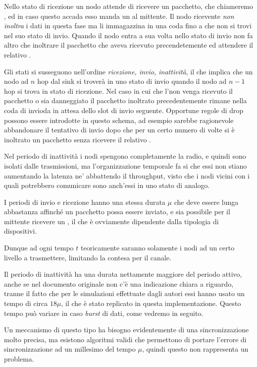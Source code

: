\documentclass[twoside,11pt,a4paper,italian,openany]{book}
\begin{document}
Nello stato di ricezione un nodo attende di ricevere un pacchetto, che chiameremo \req,
ed in caso questo accada esso manda un \ack al mittente. 
Il nodo ricevente \emph{non inoltra} i dati in questa 
fase ma li immagazzina in una coda fino a che non si trovi nel suo stato di invio. 
Quando il nodo entra a sua volta nello stato di invio non fa altro che inoltrare il pacchetto 
che aveva ricevuto precendetemente ed attendere il relativo \ack.  

Gli stati si susseguono nell'ordine \emph{ricezione, invio, inattività}, il che implica
che un nodo ad $n$ hop dal sink si troverà in uno stato di invio quando il nodo ad $n-1$ 
hop si trova in stato di ricezione. 
Nel caso in cui che l'\ack  non venga ricevuto il pacchetto o sia danneggiato il pacchetto 
inoltrato precedentemente rimane nella coda di invioda in attesa dello slot di invio seguente. 
Opportune regole di drop possono essere introdotte in questo schema, ad esempio sarebbe 
ragionevole abbandonare il tentativo di invio dopo che per un certo numero di volte si è 
inoltrato un pacchetto senza ricevere il relativo \ack. 
 
Nel periodo di inattività i nodi spengono completamente la radio, e quindi sono isolati dalle 
trasmissioni, ma l'organizzazione temporale fa si che essi non stiano aumentando la latenza ne' 
abbattendo il throughput, visto che i nodi vicini con i quali potrebbero comunicare sono 
anch'essi in uno stato di analogo. 

I periodi di invio e ricezione hanno una stessa durata $\mu$ che deve essere lunga abbastanza 
affinché un pacchetto possa essere inviato, e  sia possibile per il mittente ricevere un  
 \ack, il che è ovviamente dipendente dalla tipologia di dispositivi. 
 
Dunque ad ogni tempo $t$ teoricamente saranno solamente i nodi ad un certo livello a 
trasmettere, limitando la contesa per il canale. 

Il periodo di inattività ha una durata nettamente maggiore del periodo attivo, anche se nel 
documento originale non c'è una indicazione chiara a riguardo, tranne il fatto che per le 
simulazioni effettuate dagli autori essi hanno usato un tempo di circa $18\mu$, il che è stato replicato in questa implementazione. 
Questo tempo può variare in caso \emph{burst} di dati, come vedremo in seguito.

Un meccanismo di questo tipo ha bisogno evidentemente di una sincronizzazione molto precisa, ma 
esistono algoritmi validi\cite{sync} che permettono di portare l'errore di sincronizzazione 
ad un millesimo del tempo $\mu$, quindi questo non rappresenta un problema. 
\end{document}
